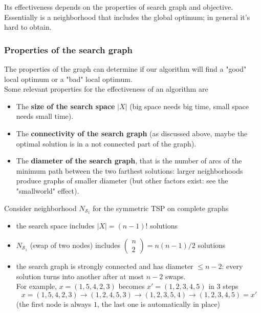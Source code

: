Its effectiveness depends on the properties of search graph and objective.\\

Essentially is a neighborhood that includes the global optimum; in general it's hard to obtain.\\

\newpage

\subsubsection{Properties of the search graph}
The properties of the graph can determine if our algorithm will find a "good" local optimum or a "bad" local optimum.\\

Some relevant properties for the effectiveness of an algorithm are
\begin{itemize}
	\item The \textbf{size of the search space} $|X|$ (big space needs big time, small space needs small time).\\
	
	\item The \textbf{connectivity of the search graph} (as discussed above, maybe the optimal solution is in a not connected part of the graph).\\
	
	\item The \textbf{diameter of the search graph}, that is the number of arcs of the minimum path between the two farthest solutions: larger neighborhoods produce graphs of smaller diameter (but other factors exist: see the "smallworld" effect).\\
\end{itemize}
\nn

Consider neighborhood $N_{\mathcal{S}_1}$ for the symmetric TSP on complete graphs
\begin{itemize}
	\item the search space includes $|X| = (n − 1)!$ solutions
	
	\item $N_{\mathcal{S}_1}$ (swap of two nodes) includes $\left(\begin{array}{c}
		n \\ 2 \end{array}\right) = n(n-1)/2$ solutions
	
	\item the search graph is strongly connected and has diameter $\leq n - 2$: every solution turns into another after at most $n - 2$ swaps.\\
	For example, $x = (1, 5, 4, 2, 3)$ becomes $x' = (1, 2, 3, 4, 5)$ in $3$ steps
	$$ x = (1, 5, 4, 2, 3) \rightarrow (1, 2, 4, 5, 3) \rightarrow (1, 2, 3, 5, 4) \rightarrow (1, 2, 3, 4, 5) = x' $$
	(the first node is always $1$, the last one is automatically in place)
\end{itemize}

